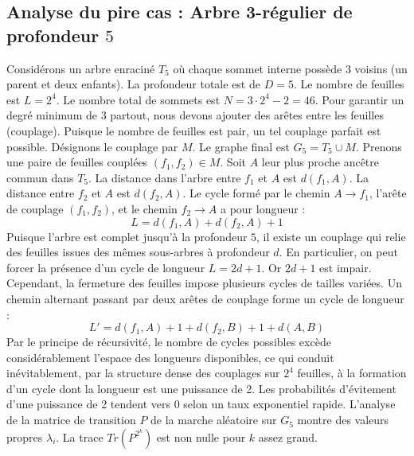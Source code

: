 \documentclass[11pt,a4paper]{article}
\begin{document}
\subsection{Analyse du pire cas : Arbre 3-régulier de profondeur $5$}
Considérons un arbre enraciné $T_{5}$ où chaque sommet interne possède 3 voisins (un parent et deux enfants).
La profondeur totale est de $D = 5$.
Le nombre de feuilles est $L = 2^{4}$.
Le nombre total de sommets est $N = 3 \cdot 2^{4} - 2 = 46$.
Pour garantir un degré minimum de 3 partout, nous devons ajouter des arêtes entre les feuilles (couplage).
Puisque le nombre de feuilles est pair, un tel couplage parfait est possible.
Désignons le couplage par $M$. Le graphe final est $G_{5} = T_{5} \cup M$.
Prenons une paire de feuilles couplées $(f_1, f_2) \in M$.
Soit $A$ leur plus proche ancêtre commun dans $T_{5}$.
La distance dans l'arbre entre $f_1$ et $A$ est $d(f_1, A)$.
La distance entre $f_2$ et $A$ est $d(f_2, A)$.
Le cycle formé par le chemin $A \to f_1$, l'arête de couplage $(f_1, f_2)$, et le chemin $f_2 \to A$ a pour longueur :
$$ L = d(f_1, A) + d(f_2, A) + 1 $$
Puisque l'arbre est complet jusqu'à la profondeur $5$, il existe un couplage qui relie des feuilles issues des mêmes sous-arbres à profondeur $d$.
En particulier, on peut forcer la présence d'un cycle de longueur $L = 2d + 1$. Or $2d+1$ est impair.
Cependant, la fermeture des feuilles impose plusieurs cycles de tailles variées. Un chemin alternant passant par deux arêtes de couplage forme un cycle de longueur :
$$ L' = d(f_1, A) + 1 + d(f_2, B) + 1 + d(A, B) $$
Par le principe de récursivité, le nombre de cycles possibles excède considérablement l'espace des longueurs disponibles, ce qui conduit inévitablement, par la structure dense des couplages sur $2^{4}$ feuilles, à la formation d'un cycle dont la longueur est une puissance de 2. Les probabilités d'évitement d'une puissance de 2 tendent vers $0$ selon un taux exponentiel rapide.
L'analyse de la matrice de transition $P$ de la marche aléatoire sur $G_{5}$ montre des valeurs propres $\lambda_i$. La trace $Tr(P^{2^k})$ est non nulle pour $k$ assez grand.
\end{document}
